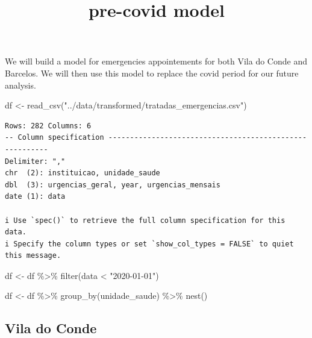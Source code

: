 \documentclass[
  number]{elsarticle}
\newenvironment{Shaded}{\begin{snugshade}}{\end{snugshade}}
\newcommand{\FunctionTok}[1]{\textcolor[rgb]{0.28,0.35,0.67}{#1}}
\newcommand{\NormalTok}[1]{\textcolor[rgb]{0.00,0.23,0.31}{#1}}
\newcommand{\OtherTok}[1]{\textcolor[rgb]{0.00,0.23,0.31}{#1}}
\newcommand{\SpecialCharTok}[1]{\textcolor[rgb]{0.37,0.37,0.37}{#1}}
\newcommand{\StringTok}[1]{\textcolor[rgb]{0.13,0.47,0.30}{#1}}
\begin{document}
\begin{frontmatter}
\title{pre-covid model}


        





\end{frontmatter}
    

We will build a model for emergencies appointements for both Vila do
Conde and Barcelos. We will then use this model to replace the covid
period for our future analysis.

\begin{Shaded}
\begin{Highlighting}[]
\NormalTok{df }\OtherTok{\textless{}{-}} \FunctionTok{read\_csv}\NormalTok{(}\StringTok{"../data/transformed/tratadas\_emergencias.csv"}\NormalTok{)}
\end{Highlighting}
\end{Shaded}

\begin{verbatim}
Rows: 282 Columns: 6
-- Column specification --------------------------------------------------------
Delimiter: ","
chr  (2): instituicao, unidade_saude
dbl  (3): urgencias_geral, year, urgencias_mensais
date (1): data

i Use `spec()` to retrieve the full column specification for this data.
i Specify the column types or set `show_col_types = FALSE` to quiet this message.
\end{verbatim}

\begin{Shaded}
\begin{Highlighting}[]
\NormalTok{df }\OtherTok{\textless{}{-}}\NormalTok{ df }\SpecialCharTok{\%\textgreater{}\%} \FunctionTok{filter}\NormalTok{(data }\SpecialCharTok{\textless{}} \StringTok{"2020{-}01{-}01"}\NormalTok{) }

\NormalTok{df }\OtherTok{\textless{}{-}}\NormalTok{ df }\SpecialCharTok{\%\textgreater{}\%} 
    \FunctionTok{group\_by}\NormalTok{(unidade\_saude) }\SpecialCharTok{\%\textgreater{}\%} 
    \FunctionTok{nest}\NormalTok{()}
\end{Highlighting}
\end{Shaded}

\subsection{Vila do Conde}\label{vila-do-conde}
\end{document}
